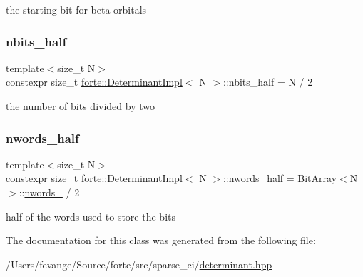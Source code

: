 the starting bit for beta orbitals 

\mbox{\label{classforte_1_1_determinant_impl_ac8d2a64c2fb785ccb79b1cecc553d63d}} 
\subsubsection{\texorpdfstring{nbits\+\_\+half}{nbits\_half}}
{\footnotesize\ttfamily template$<$size\+\_\+t N$>$ \\
constexpr size\+\_\+t \mbox{\hyperlink{classforte_1_1_determinant_impl}{forte\+::\+Determinant\+Impl}}$<$ N $>$\+::nbits\+\_\+half = N / 2\hspace{0.3cm}{\ttfamily [static]}}



the number of bits divided by two 

\mbox{\label{classforte_1_1_determinant_impl_a7474c95c308be22daaa9cd26aed8a035}} 
\subsubsection{\texorpdfstring{nwords\+\_\+half}{nwords\_half}}
{\footnotesize\ttfamily template$<$size\+\_\+t N$>$ \\
constexpr size\+\_\+t \mbox{\hyperlink{classforte_1_1_determinant_impl}{forte\+::\+Determinant\+Impl}}$<$ N $>$\+::nwords\+\_\+half = \mbox{\hyperlink{classforte_1_1_bit_array}{Bit\+Array}}$<$N$>$\+::\mbox{\hyperlink{classforte_1_1_bit_array_aeaa8016f00f9ffc5822081f7e45656e8}{nwords\+\_\+}} / 2\hspace{0.3cm}{\ttfamily [static]}}



half of the words used to store the bits 



The documentation for this class was generated from the following file\+:\begin{DoxyCompactItemize}
\item 
/\+Users/fevange/\+Source/forte/src/sparse\+\_\+ci/\mbox{\hyperlink{determinant_8hpp}{determinant.\+hpp}}\end{DoxyCompactItemize}

